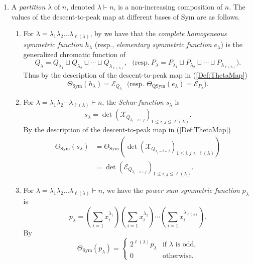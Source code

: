 \documentclass[11pt]{amsart}
\numberwithin{equation}{section}
\newcommand{\QSym}{\mathrm{QSym}}
\newcommand{\Sym}{\mathrm{Sym}}
\newcommand{\scrX}{{\mathscr{X}}}
\newcommand{\scrE}{{\mathscr{E}}}
\begin{document}
\begin{enumerate}[leftmargin=*]
\item A \emph{partition} $\lambda$ of $n$, denoted $\lambda\vdash n$, is a non-increasing composition of $n$.   The values of the descent-to-peak map at different bases of $\Sym$ are as follows. 
\begin{enumerate} 
\item For $\lambda=\lambda_1\lambda_2\dots \lambda_{\ell(\lambda)}$, 
by \cite[Table 2]{ALvW23} we have that the \emph{complete homogeneous symmetric function}  $h_\lambda$ (resp., \emph{elementary symmetric function} $e_\lambda$) is the generalized chromatic function of
$$Q_{\lambda}=Q_{\lambda_1} \sqcup Q_{\lambda_2} \sqcup \cdots \sqcup  Q_{\lambda_{\ell(\lambda)}},~~~{\text{(resp.}~ P_{\lambda}=P_{\lambda_1} \sqcup P_{\lambda_2} \sqcup \cdots \sqcup  P_{\lambda_{\ell(\lambda)}})}.$$ 
Thus by the description of the descent-to-peak map in (\ref{Def:ThetaMap})
$$\Theta_{\Sym}(h_\lambda)=\scrE_{Q_{\lambda}}~~~\text{(resp. $\Theta_{\QSym}(e_\lambda)=\scrE_{P_{\lambda}}$)}.$$ 


\item  For $\lambda=\lambda_1\lambda_2\cdots \lambda_{\ell(\lambda)}\vdash n$, the \emph{Schur function} $s_\lambda$ is 
$$s_\lambda=\det \left( \scrX_{Q_{\lambda_i-i+j} } \right)_{1\leq i,j\leq \ell(\lambda)}.$$ By  the description of the descent-to-peak map in (\ref{Def:ThetaMap})
\begin{align*}
\Theta_{\Sym}(s_\lambda)&=\Theta_{\Sym}(\det \left( \scrX_{Q_{\lambda_i-i+j} } \right)_{1\leq i,j\leq \ell(\lambda)})\\
&=\det \left( \scrE_{Q_{\lambda_i-i+j} } \right)_{1\leq i,j\leq \ell(\lambda)}.
\end{align*}

\item  For $\lambda=\lambda_1 \lambda_2\dots \lambda_{\ell(\lambda)}\vdash n$, we have the \emph{power sum symmetric function} $p_\lambda$ is 
$$p_\lambda=\left(\sum_{i=1} x_{i}^{\lambda_1}\right)\left(\sum_{i=1} x_{i}^{\lambda_2}\right) \cdots \left(\sum_{i=1} x_{i}^{\lambda_{\ell(\lambda)}}\right).$$
By \cite[Chapter III, Example 10]{M95}
$$ \Theta_\Sym(p_\lambda)=\begin{cases}
2^{\ell(\lambda)} p_{\lambda} & \text{if $\lambda$ is odd,}\\
0 & \text{otherwise.}
\end{cases} $$

\end{enumerate} 




\end{enumerate}
\end{document}
